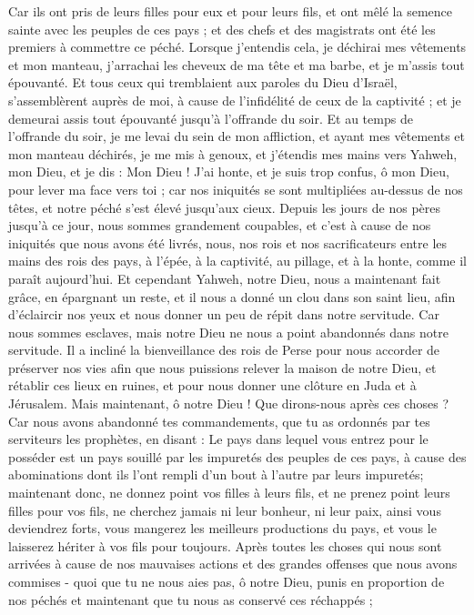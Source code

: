\begin{multicols}{2}
Car ils ont pris de leurs filles pour eux et pour leurs fils, et ont mêlé la semence sainte avec les peuples de ces pays ; et des chefs et des magistrats ont été les premiers à commettre ce péché.
Lorsque j'entendis cela, je déchirai mes vêtements et mon manteau, j'arrachai les cheveux de ma tête et ma barbe, et je m'assis tout épouvanté.
Et tous ceux qui tremblaient aux paroles du Dieu d'Israël, s'assemblèrent auprès de moi, à cause de l’infidélité de ceux de la captivité ; et je demeurai assis tout épouvanté jusqu'à l'offrande du soir.
Et au temps de l'offrande du soir, je me levai du sein de mon affliction, et ayant mes vêtements et mon manteau déchirés, je me mis à genoux, et j'étendis mes mains vers Yahweh, mon Dieu,
et je dis : Mon Dieu ! J’ai honte, et je suis trop confus, ô mon Dieu, pour lever ma face vers toi ; car nos iniquités se sont multipliées au-dessus de nos têtes, et notre péché s'est élevé jusqu’aux cieux.
Depuis les jours de nos pères jusqu'à ce jour, nous sommes grandement coupables, et c’est à cause de nos iniquités que nous avons été livrés, nous, nos rois et nos sacrificateurs entre les mains des rois des pays, à l'épée, à la captivité, au pillage, et à la honte, comme il paraît aujourd'hui.
Et cependant Yahweh, notre Dieu, nous a maintenant fait grâce, en épargnant un reste, et il nous a donné un clou dans son saint lieu, afin d'éclaircir nos yeux et nous donner un peu de répit dans notre servitude.
Car nous sommes esclaves, mais notre Dieu ne nous a point abandonnés dans notre servitude. Il a incliné la bienveillance des rois de Perse pour nous accorder de préserver nos vies afin que nous puissions relever la maison de notre Dieu, et rétablir ces lieux en ruines, et pour nous donner une clôture en Juda et à Jérusalem.
Mais maintenant, ô notre Dieu ! Que dirons-nous après ces choses ? Car nous avons abandonné tes commandements,
que tu as ordonnés par tes serviteurs les prophètes, en disant : Le pays dans lequel vous entrez pour le posséder est un pays souillé par les impuretés des peuples de ces pays, à cause des abominations dont ils l'ont rempli d’un bout à l'autre par leurs impuretés;
maintenant donc, ne donnez point vos filles à leurs fils, et ne prenez point leurs filles pour vos fils, ne cherchez jamais ni leur bonheur, ni leur paix, ainsi vous deviendrez forts,  vous mangerez les meilleurs productions du pays, et vous le laisserez hériter à vos fils pour toujours.
Après toutes les choses qui nous sont arrivées à cause de nos mauvaises actions et des grandes offenses que nous avons commises - quoi que tu ne nous aies pas, ô notre Dieu, punis en proportion de nos péchés et maintenant que  tu nous as conservé ces réchappés ; 

\end{multicols}
